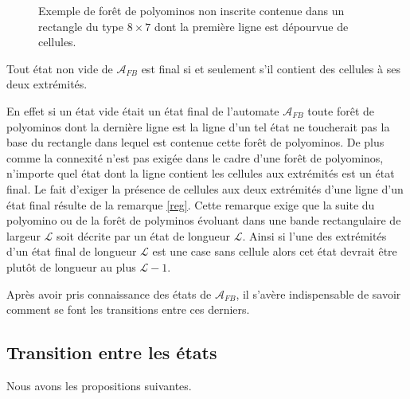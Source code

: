 \begin{figure}[!htb]
\begin{minipage}[c]{.24\linewidth}
  \centering
 \end{minipage}\hfill
\begin{minipage}[c]{.66\linewidth}
  \centering
\begin{logicpuzzle}[rows=7,columns=8,color=cyan!100,width=750px,scale=0.5]
\end{logicpuzzle}
\end{minipage}
\caption{\label{fig2chap3o} Exemple de forêt de polyominos non inscrite contenue dans un rectangle du type $8\times 7$  dont la première ligne est dépourvue de cellules.}
\end{figure}
\begin{Prop}\label{prop2chp3}
Tout état  non vide de $\mathcal{A}_{FB}$ est final si et seulement s'il contient des cellules à ses deux extrémités.
\end{Prop}
\begin{Pre}
En effet si un état vide était un  état final de l'automate $\mathcal{A}_{FB}$ toute forêt de polyominos dont la dernière ligne est la ligne d'un tel état ne toucherait pas la base du rectangle dans lequel est contenue cette forêt de polyominos. De plus comme la connexité n'est pas exigée dans le cadre d'une forêt de polyominos, n'importe quel état dont la ligne contient les cellules aux extrémités est un état final. Le fait d'exiger la présence de cellules  aux deux extrémités d'une ligne d'un état final résulte de la remarque \ref{reg}. Cette remarque exige que la suite du polyomino ou  de la forêt de polyminos évoluant dans une bande rectangulaire de largeur  $\mathcal{L}$ soit décrite par un état de longueur $\mathcal{L}$. Ainsi si l'une des extrémités d'un état final de longueur  $\mathcal{L}$  est une case sans cellule alors cet état devrait être plutôt de longueur au plus $\mathcal{L}-1$. 
\end{Pre}
Après avoir pris connaissance des états de $\mathcal{A}_{FB}$, il s'avère indispensable de savoir comment se font les transitions entre ces derniers.
\subsection{Transition entre les états}
Nous avons les propositions suivantes.

